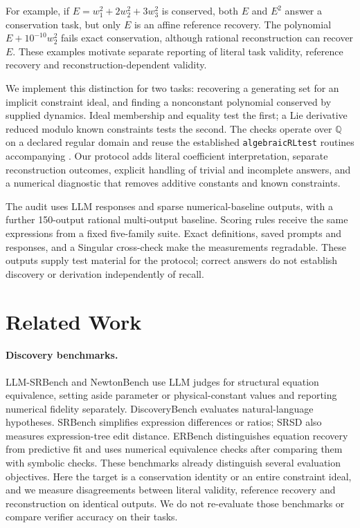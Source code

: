 \documentclass[10pt]{article}
\newcommand{\Q}{\mathbb{Q}}
\begin{document}
For example, if $E=w_1^2+2w_2^2+3w_3^2$ is conserved, both $E$ and $E^2$ answer a conservation task, but only $E$ is an affine reference recovery. The polynomial $E+10^{-10}w_2^2$ fails exact conservation, although rational reconstruction can recover $E$. These examples motivate separate reporting of literal task validity, reference recovery and reconstruction-dependent validity.

We implement this distinction for two tasks: recovering a generating set for an implicit constraint ideal, and finding a nonconstant polynomial conserved by supplied dynamics. Ideal membership and equality test the first; a Lie derivative reduced modulo known constraints tests the second. The checks operate over $\Q$ on a declared regular domain and reuse the established \texttt{algebraicRLtest} routines accompanying \citet{gebrekidan2026diagnosing}. Our protocol adds literal coefficient interpretation, separate reconstruction outcomes, explicit handling of trivial and incomplete answers, and a numerical diagnostic that removes additive constants and known constraints.

The audit uses \nLLM{} LLM responses and \nBaseline{} sparse numerical-baseline outputs, with a further 150-output rational multi-output baseline. Scoring rules receive the same expressions from a fixed five-family suite. Exact definitions, saved prompts and responses, and a Singular cross-check make the measurements regradable. These outputs supply test material for the protocol; correct answers do not establish discovery or derivation independently of recall.

\section{Related Work}

\paragraph{Discovery benchmarks.} LLM-SRBench \citep{shojaee2025llmsrbench} and NewtonBench \citep{newtonbench2026} use LLM judges for structural equation equivalence, setting aside parameter or physical-constant values and reporting numerical fidelity separately. DiscoveryBench \citep{majumder2025discoverybench} evaluates natural-language hypotheses. SRBench \citep{lacava2021srbench} simplifies expression differences or ratios; SRSD \citep{matsubara2024srsd} also measures expression-tree edit distance. ERBench \citep{kahlmeyer2026erbench} distinguishes equation recovery from predictive fit and uses numerical equivalence checks after comparing them with symbolic checks. These benchmarks already distinguish several evaluation objectives. Here the target is a conservation identity or an entire constraint ideal, and we measure disagreements between literal validity, reference recovery and reconstruction on identical outputs. We do not re-evaluate those benchmarks or compare verifier accuracy on their tasks.
\end{document}
